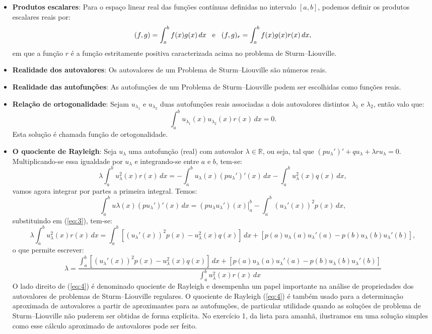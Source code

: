 \documentclass[10pt,a4paper]{article}
\begin{document}
	\begin{itemize}
		\item \textbf{Produtos escalares}: Para o espaço linear real das funções contínuas definidas no intervalo $[a,b]$, podemos definir os produtos escalares reais por: \[(f,g) = \int_a^b f(x)g(x)\,dx \hspace{.3cm}\text{e}\hspace{.3cm}(f,g)_r = \int_a^bf(x)g(x)r(x)\,dx,\] em que a função $r$ é a função estritamente positiva caracterizada acima no problema de Sturm--Liouville.
		\item \textbf{Realidade dos autovalores}: Os autovalores de um Problema de Sturm--Liouville são números reais.
		\item \textbf{Realidade das autofunções}: As autofunções de um Problema de Sturm--Liouville podem ser escolhidas como funções reais.
		\item \textbf{Relação de ortogonalidade}: Sejam $u_{\lambda_1}$ e $u_{\lambda_2}$ duas autofunções reais associadas a dois autovalores distintos $\lambda_1$ e $\lambda_2$, então valo que: \[\int_a^b u_{\lambda_1}(x)u_{\lambda_2}(x)r(x)\,dx = 0.\] Esta solução é chamada função de ortogonalidade.
		\item \textbf{O quociente de Rayleigh}: Seja $u_\lambda$ uma autofunção (real) com autovalor $\lambda\in\mathbb{R}$, ou seja, tal que $(pu_\lambda')'+qu_\lambda+\lambda ru_\lambda = 0$. Multiplicando-se essa igualdade por $u_\lambda$ e integrando-se entre $a$ e $b$, tem-se:
		\begin{equation}
			\lambda\int_a^b u_\lambda^2(x)r(x)\,dx = -\int_a^bu_\lambda(x)(pu_\lambda')'(x)\,dx - \int_a^bu_\lambda^2(x)q(x)\,dx,
			\label{eq:3}
		\end{equation}
		vamos agora integrar por partes a primeira integral. Temos: \[\int_a^bu\lambda(x)(pu_\lambda')'(x)\,dx = \left. (pu_\lambda u_\lambda')(x) \right|_a^b - \int_a^b(u_\lambda'(x))^2p(x)\,dx,\] substituindo em (\ref{eq:3}), tem-se: \[\lambda\int_a^b u_\lambda^2(x)r(x)\,dx = \int_a^b\left[(u_\lambda'(x))^2p(x)-u_\lambda^2(x)q(x)\right]\,dx + \left[p(a)u_\lambda(a)u_\lambda'(a)-p(b)u_\lambda(b)u_\lambda'(b)\right],\]
		o que permite escrever:
		\begin{equation}
			\lambda = \frac{\int_a^b\left[(u_\lambda'(x))^2p(x)-u_\lambda^2(x)q(x)\right]\,dx + \left[p(a)u_\lambda(a)u_\lambda'(a)-p(b)u_\lambda(b)u_\lambda'(b)\right]}{\int_a^b u_\lambda^2(x)r(x)\,dx}
			\label{eq:4}
		\end{equation}
		O lado direito de (\ref{eq:4}) é denominado quociente de Rayleigh e desempenha um papel importante na análise de propriedades dos autovalores de problemas de Sturm--Liouville regulares. O quociente de Rayleigh (\ref{eq:4}) é também usado para a determinação aproximada de autovalores a partir de aproximantes para as autofunções, de particular utilidade quando as soluções de problema de Sturm--Liouville não puderem ser obtidas de forma explícita. No exercício 1, da lista para amanhã, ilustramos em uma solução simples como esse cálculo aproximado de autovalores pode ser feito.
	\end{itemize}
\end{document}
